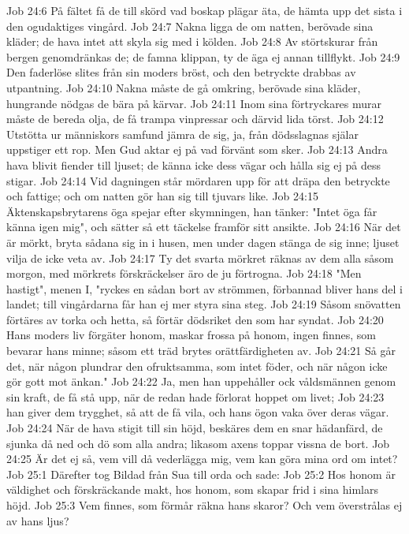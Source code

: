 Job 24:6  På fältet få de till skörd vad boskap plägar äta, de hämta upp det sista i den ogudaktiges vingård.
Job 24:7  Nakna ligga de om natten, berövade sina kläder; de hava intet att skyla sig med i kölden.
Job 24:8  Av störtskurar från bergen genomdränkas de; de famna klippan, ty de äga ej annan tillflykt.
Job 24:9  Den faderlöse slites från sin moders bröst, och den betryckte drabbas av utpantning.
Job 24:10  Nakna måste de gå omkring, berövade sina kläder, hungrande nödgas de bära på kärvar.
Job 24:11  Inom sina förtryckares murar måste de bereda olja, de få trampa vinpressar och därvid lida törst.
Job 24:12  Utstötta ur människors samfund jämra de sig, ja, från dödsslagnas själar uppstiger ett rop. Men Gud aktar ej på vad förvänt som sker.
Job 24:13  Andra hava blivit fiender till ljuset; de känna icke dess vägar och hålla sig ej på dess stigar.
Job 24:14  Vid dagningen står mördaren upp för att dräpa den betryckte och fattige; och om natten gör han sig till tjuvars like.
Job 24:15  Äktenskapsbrytarens öga spejar efter skymningen, han tänker: "Intet öga får känna igen mig", och sätter så ett täckelse framför sitt ansikte.
Job 24:16  När det är mörkt, bryta sådana sig in i husen, men under dagen stänga de sig inne; ljuset vilja de icke veta av.
Job 24:17  Ty det svarta mörkret räknas av dem alla såsom morgon, med mörkrets förskräckelser äro de ju förtrogna.
Job 24:18  "Men hastigt", menen I, "ryckes en sådan bort av strömmen, förbannad bliver hans del i landet; till vingårdarna får han ej mer styra sina steg.
Job 24:19  Såsom snövatten förtäres av torka och hetta, så förtär dödsriket den som har syndat.
Job 24:20  Hans moders liv förgäter honom, maskar frossa på honom, ingen finnes, som bevarar hans minne; såsom ett träd brytes orättfärdigheten av.
Job 24:21  Så går det, när någon plundrar den ofruktsamma, som intet föder, och när någon icke gör gott mot änkan."
Job 24:22  Ja, men han uppehåller ock våldsmännen genom sin kraft, de få stå upp, när de redan hade förlorat hoppet om livet;
Job 24:23  han giver dem trygghet, så att de få vila, och hans ögon vaka över deras vägar.
Job 24:24  När de hava stigit till sin höjd, beskäres dem en snar hädanfärd, de sjunka då ned och dö som alla andra; likasom axens toppar vissna de bort.
Job 24:25  Är det ej så, vem vill då vederlägga mig, vem kan göra mina ord om intet?
Job 25:1  Därefter tog Bildad från Sua till orda och sade:
Job 25:2  Hos honom är väldighet och förskräckande makt, hos honom, som skapar frid i sina himlars höjd.
Job 25:3  Vem finnes, som förmår räkna hans skaror? Och vem överstrålas ej av hans ljus?
